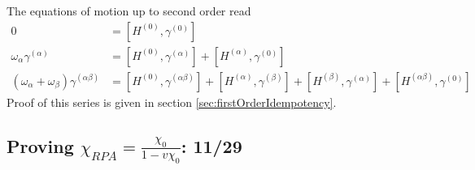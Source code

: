 The equations of motion up to second order read
\begin{align}
0 &=\left[H^{(0)}, \gamma^{(0)}\right] \\
\omega_{\alpha} \gamma^{(\alpha)}& =\left[H^{(0)}, \gamma^{(\alpha)}\right]+\left[H^{(\alpha)}, \gamma^{(0)}\right]\\
\left(\omega_{\alpha}+\omega_{\beta}\right) \gamma^{(\alpha \beta)}& = {\left[H^{(0)}, \gamma^{(\alpha \beta)}\right]+\left[H^{(\alpha)}, \gamma^{(\beta)}\right] } +\left[H^{(\beta)}, \gamma^{(\alpha)}\right]+\left[H^{(\alpha \beta)}, \gamma^{(0)}\right]
\end{align}
Proof of this series is given in section \ref{sec:firstOrderIdempotency}. 
\subsection{Proving $\chi_{RPA}=\frac{\chi_0}{1-v\chi_0}$: 11/29}

